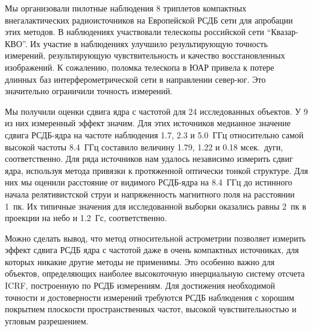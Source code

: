 Мы организовали пилотные наблюдения 8 триплетов компактных внегалактических радиоисточников на
Европейской РСДБ сети для апробации этих методов. В наблюдениях участвовали телескопы российской
сети ``Квазар-КВО''. Их участие в наблюдениях улучшило результирующую точность измерений,
результирующую чувствительность и качество восстановленных изображений. К сожалению, поломка
телескопа в ЮАР привела к потере длинных баз интерферометрической сети в направлении север-юг. Это
значительно ограничили точность измерений.

Мы получили оценки сдвига ядра с частотой для 24 исследованных объектов. У 9 из них измеренный
эффект значим. Для этих источников медианное значение сдвига РСДБ-ядра на частоте наблюдения 1.7,
2.3 и 5.0~ГГц относительно самой высокой частоты 8.4~ГГц составило величину 1.79, 1.22 и 0.18
мсек.~дуги, соответственно.
%
Для ряда источников нам удалось независимо измерить сдвиг ядра, используя метода привязки к
протяженной оптически тонкой структуре. Для них мы оценили расстояние от видимого РСДБ-ядра на
8.4~ГГц до истинного начала релятивистской струи и напряженность магнитного поля на расстоянии 1~пк.
Их типичные значения для исследованной выборки оказались равны 2~пк в проекции на небо и 1.2~Гс,
соответственно.

Можно сделать вывод, что метод относительной астрометрии позволяет измерить эффект сдвига РСДБ ядра
с частотой даже в очень компактных источниках, для которых никакие другие методы не применимы. Это
особенно важно для объектов, определяющих наиболее высокоточную инерциальную систему отсчета ICRF,
построенную по РСДБ измерениям. Для достижения необходимой точности и достоверности измерений
требуются РСДБ наблюдения с хорошим покрытием плоскости пространственных частот, высокой
чувствительностью и угловым разрешением.



